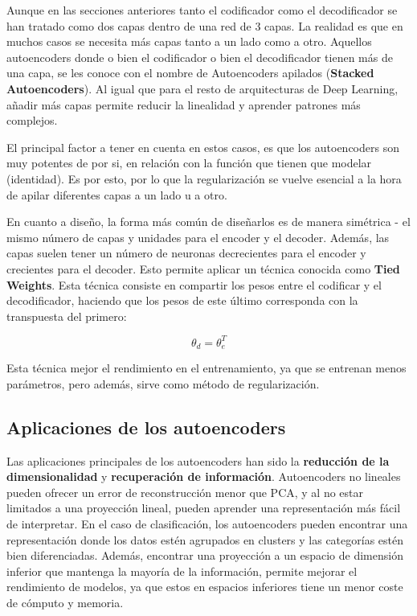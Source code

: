 \documentclass[
  12pt,
  a4paperpaper,
]{report}
\begin{document}
Aunque en las secciones anteriores tanto el codificador como el
decodificador se han tratado como dos capas dentro de una red de 3
capas. La realidad es que en muchos casos se necesita más capas tanto a
un lado como a otro. Aquellos autoencoders donde o bien el codificador o
bien el decodificador tienen más de una capa, se les conoce con el
nombre de Autoencoders apilados (\textbf{Stacked Autoencoders}). Al
igual que para el resto de arquitecturas de Deep Learning, añadir más
capas permite reducir la linealidad y aprender patrones más complejos.

El principal factor a tener en cuenta en estos casos, es que los
autoencoders son muy potentes de por si, en relación con la función que
tienen que modelar (identidad). Es por esto, por lo que la
regularización se vuelve esencial a la hora de apilar diferentes capas a
un lado u a otro.

En cuanto a diseño, la forma más común de diseñarlos es de manera
simétrica - el mismo número de capas y unidades para el encoder y el
decoder. Además, las capas suelen tener un número de neuronas
decrecientes para el encoder y crecientes para el decoder. Esto permite
aplicar un técnica conocida como \textbf{Tied Weights}. Esta técnica
consiste en compartir los pesos entre el codificar y el decodificador,
haciendo que los pesos de este último corresponda con la transpuesta del
primero:

\[\theta_{d} = \theta_{e}^T\]

Esta técnica mejor el rendimiento en el entrenamiento, ya que se
entrenan menos parámetros, pero además, sirve como método de
regularización.

\hypertarget{aplicaciones-de-los-autoencoders}{%
\subsection{Aplicaciones de los
autoencoders}\label{aplicaciones-de-los-autoencoders}}

Las aplicaciones principales de los autoencoders han sido la
\textbf{reducción de la dimensionalidad} y \textbf{recuperación de
información}. Autoencoders no lineales pueden ofrecer un error de
reconstrucción menor que PCA, y al no estar limitados a una proyección
lineal, pueden aprender una representación más fácil de interpretar. En
el caso de clasificación, los autoencoders pueden encontrar una
representación donde los datos estén agrupados en clusters y las
categorías estén bien diferenciadas. Además, encontrar una proyección a
un espacio de dimensión inferior que mantenga la mayoría de la
información, permite mejorar el rendimiento de modelos, ya que estos en
espacios inferiores tiene un menor coste de cómputo y memoria.
\end{document}

